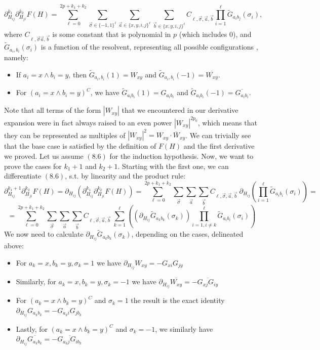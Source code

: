 \documentclass[11pt]{article}
\begin{document}
\begin{equation*}
\partial_{H_{ij}}^{k_1}\partial_{H_{ji}}^{k_2} F(H)= \sum_{\ell=0}^{2p+k_1+k_2} \sum_{\vec\sigma\in \{-1,1\}^\ell}\sum_{\vec a\in \{x, y, i, j\}^\ell}\sum_{\vec b\in \{x, y, i, j\}^\ell} C_{\ell, \vec \sigma, \vec a, \vec b} \prod_{i=1}^\ell \tilde{G}_{a_i b_j}(\sigma_i)\tag{8.6},
\end{equation*}
where $C_{\ell, \vec \sigma \vec a, \vec b}$ is some constant that is polynomial in $p$ (which includes $0$), and $\tilde{G}_{a_i,b_i}(\sigma_i)$ is a function of the resolvent, representing all possible configurations , namely: 
\begin{itemize}
\item If $a_i=x \wedge b_i=y$, then $\tilde{G}_{a_i, b_i}(1) = W_{xy}$ and  $\tilde{G}_{a_i, b_i}(-1) = \overline{W_{xy}}$.
\item For $(a_i=x\wedge b_i=y)^C$, we have $\tilde G_{a_ib_i}(1) = G_{a_ib_i}$ and $\tilde G_{a_ib_i}(-1) = \overline{G_{a_ib_i}}$.
 \end{itemize} 
Note that all terms of the form $|W_{xy}|$ that we encountered in our derivative expansion were in fact always raised to an even power $|W_{xy}|^{2p_0}$, which means that they can be represented as multiples of $|W_{xy}|^{2} = W_{xy}\cdot \overline{W}_{xy}$.  We can trivially see that the base case is satisfied by the definition of $F(H)$ and the first derivative we proved. Let us assume $(8.6)$ for the induction hypothesis. Now, we want to prove the cases for $k_1+1$ and $k_2+1$. Starting with the first one, we can differentiate $(8.6)$, s.t. by linearity and the product rule: $$\partial_{H_{ij}}^{k_1+1}\partial_{H_{ji}}^{k_2} F(H) = \partial_{H_{ij}}\left(\partial_{H_{ij}}^{k_1}\partial_{H_{ji}}^{k_2} F(H)\right) = \sum_{\ell=0}^{2p+k_1+k_2} \sum_{\vec\sigma}\sum_{\vec a}\sum_{\vec b} C_{\ell, \vec \sigma, \vec a, \vec b}\  \partial_{H_{ij}}\left(\prod_{i=1}^\ell \tilde{G}_{a_i b_i}(\sigma_i)\right)=$$
$$=\sum_{\ell=0}^{2p+k_1+k_2} \sum_{\vec\sigma}\sum_{\vec a}\sum_{\vec b}C_{\ell, \vec \sigma, \vec a, \vec b}\ \sum_{k=1}^\ell \left(\left(\partial_{H_{ij}}\tilde{G}_{a_k b_k}(\sigma_k)\right) \prod_{i=1,i\neq k}^\ell \tilde{G}_{a_i b_i}(\sigma_i)\right) $$
We now need to calculate $\partial_{H_{ij}}\tilde{G}_{a_k b_k}(\sigma_k)$, depending on the cases, delineated above:
\begin{itemize}

\item For $a_k=x, b_k=y, \sigma_k=1$ we have $\partial_{H_{ij}} W_{xy} = -G_{xi}G_{jy}$

\item Similarly, for $a_k=x, b_k=y, \sigma_k=-1$ we have $\partial_{H_{ij}} \overline{W_{xy}} = -\overline{G_{xj}G_{iy}}$

\item For $(a_k=x\wedge b_k=y)^C$ and $\sigma_k = 1$ the result is the exact identity $\partial_{H_{ij}} G_{a_k b_k} = -G_{a_k i}G_{j b_k}$

\item Lastly, for $(a_k=x\wedge b_k=y)^C$ and $\sigma_k=-1$, we similarly have $\partial_{H_{ij}} \overline{G_{a_k b_k}} = -\overline{G_{a_k j}G_{i b_k}}$
\end{itemize}
\end{document}
